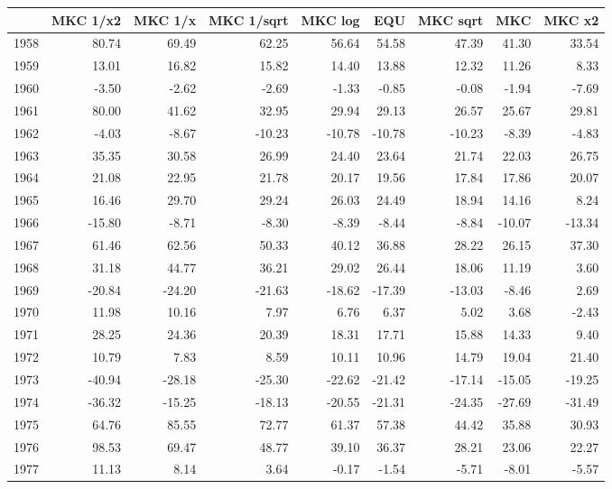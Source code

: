 \begin{table}[ht]
\centering
\begin{tabular}{rrrrrrrrr}
  \hline
 & MKC 1/x2 & MKC 1/x & MKC 1/sqrt & MKC log & EQU & MKC sqrt & MKC & MKC x2 \\ 
  \hline
1958 & 80.74 & 69.49 & 62.25 & 56.64 & 54.58 & 47.39 & 41.30 & 33.54 \\ 
  1959 & 13.01 & 16.82 & 15.82 & 14.40 & 13.88 & 12.32 & 11.26 & 8.33 \\ 
  1960 & -3.50 & -2.62 & -2.69 & -1.33 & -0.85 & -0.08 & -1.94 & -7.69 \\ 
  1961 & 80.00 & 41.62 & 32.95 & 29.94 & 29.13 & 26.57 & 25.67 & 29.81 \\ 
  1962 & -4.03 & -8.67 & -10.23 & -10.78 & -10.78 & -10.23 & -8.39 & -4.83 \\ 
  1963 & 35.35 & 30.58 & 26.99 & 24.40 & 23.64 & 21.74 & 22.03 & 26.75 \\ 
  1964 & 21.08 & 22.95 & 21.78 & 20.17 & 19.56 & 17.84 & 17.86 & 20.07 \\ 
  1965 & 16.46 & 29.70 & 29.24 & 26.03 & 24.49 & 18.94 & 14.16 & 8.24 \\ 
  1966 & -15.80 & -8.71 & -8.30 & -8.39 & -8.44 & -8.84 & -10.07 & -13.34 \\ 
  1967 & 61.46 & 62.56 & 50.33 & 40.12 & 36.88 & 28.22 & 26.15 & 37.30 \\ 
  1968 & 31.18 & 44.77 & 36.21 & 29.02 & 26.44 & 18.06 & 11.19 & 3.60 \\ 
  1969 & -20.84 & -24.20 & -21.63 & -18.62 & -17.39 & -13.03 & -8.46 & 2.69 \\ 
  1970 & 11.98 & 10.16 & 7.97 & 6.76 & 6.37 & 5.02 & 3.68 & -2.43 \\ 
  1971 & 28.25 & 24.36 & 20.39 & 18.31 & 17.71 & 15.88 & 14.33 & 9.40 \\ 
  1972 & 10.79 & 7.83 & 8.59 & 10.11 & 10.96 & 14.79 & 19.04 & 21.40 \\ 
  1973 & -40.94 & -28.18 & -25.30 & -22.62 & -21.42 & -17.14 & -15.05 & -19.25 \\ 
  1974 & -36.32 & -15.25 & -18.13 & -20.55 & -21.31 & -24.35 & -27.69 & -31.49 \\ 
  1975 & 64.76 & 85.55 & 72.77 & 61.37 & 57.38 & 44.42 & 35.88 & 30.93 \\ 
  1976 & 98.53 & 69.47 & 48.77 & 39.10 & 36.37 & 28.21 & 23.06 & 22.27 \\ 
  1977 & 11.13 & 8.14 & 3.64 & -0.17 & -1.54 & -5.71 & -8.01 & -5.57 \\ 

\end{tabular}
\end{table}
